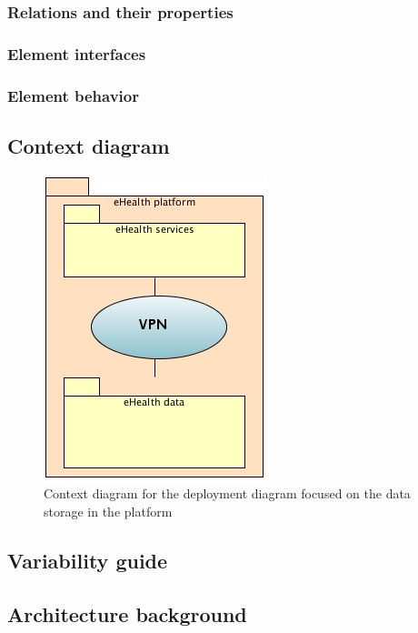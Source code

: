 \documentclass[a4paper,10pt]{article}
\begin{document}
\subsubsection{Relations and their properties}

\subsubsection{Element interfaces}

\subsubsection{Element behavior}

\subsection{Context diagram}
\begin{center}
    \begin{figure}[!h]
      \includegraphics[scale=0.75]{../images/deployment_data_context.jpg}
	\caption{Context diagram for the deployment diagram focused on the data storage in the platform}
    \end{figure}
  \end{center}

\subsection{Variability guide}

\subsection{Architecture background}
\end{document}
